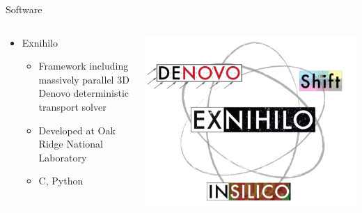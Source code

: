 \documentclass{beamer}
\newcommand{\cpp}{C\nolinebreak\hspace{-.05em}\raisebox{.4ex}{\tiny\bf +}\nolinebreak\hspace{-.10em}\raisebox{.4ex}{\tiny\bf +}}
\begin{document}
\begin{frame}{Software\nocite{exum,denovo}}
%
\begin{columns}
\begin{column}{0.5\textwidth}
\begin{itemize}
\item{Exnihilo}
\begin{itemize}
\item{Framework including massively parallel 3D Denovo deterministic transport solver}
\item{Developed at Oak Ridge National Laboratory}
\item{\cpp, Python}
\end{itemize}
\end{itemize}
\end{column}
%
\begin{column}{0.5\textwidth}
\includegraphics[width=\textwidth,natwidth=932,natheight=754]{img/exnihilo.png}
\end{column}
\end{columns}
%
\end{frame}
\end{document}
